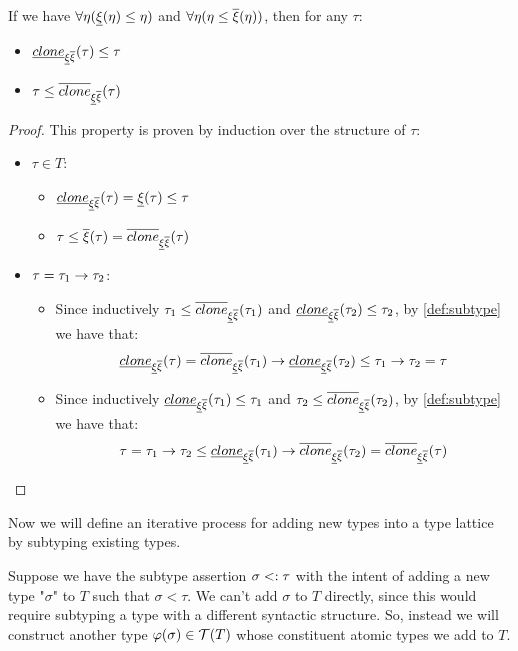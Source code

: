 \documentclass[main.tex]{subfiles}
\begin{document}
\begin{property}
    \label{prop:clone:rel}
    If we have $\forall \eta (\underline{\xi}(\eta) \leq \eta)$ and
    $\forall \eta (\eta \leq \overline{\xi}(\eta))$, then for
    any $\tau$:
    \begin{itemize}
        \item $\underline{clone}_{\underline{\xi} \overline{\xi}}(\tau) \leq \tau$
        \item $\tau \leq \overline{clone}_{\underline{\xi} \overline{\xi}}(\tau)$
    \end{itemize}
\end{property}
\begin{proof}
    This property is proven by induction over the structure of $\tau$:

    \begin{itemize}
        \item $\tau \in T$:
            \begin{itemize}
                \item $\underline{clone}_{\underline{\xi} \overline{\xi}}(\tau) = \underline{\xi}(\tau) \leq \tau$
                \item $\tau \leq \overline{\xi}(\tau) = \overline{clone}_{\underline{\xi} \overline{\xi}}(\tau)$
            \end{itemize}
        \item $\tau = \tau_1 \rightarrow \tau_2$:
            \begin{itemize}
                \item Since inductively $\tau_1 \leq \overline{clone}_{\underline{\xi} \overline{\xi}}(\tau_1)$
                    and $\underline{clone}_{\underline{\xi} \overline{\xi}}(\tau_2) \leq \tau_2$, by \cref{def:subtype}
                    we have that:
                    \[ \underline{clone}_{\underline{\xi} \overline{\xi}}(\tau) = \overline{clone}_{\underline{\xi} \overline{\xi}}(\tau_1) \rightarrow \underline{clone}_{\underline{\xi} \overline{\xi}}(\tau_2)
                    \leq \tau_1 \rightarrow \tau_2 = \tau \]
                \item Since inductively $\underline{clone}_{\underline{\xi} \overline{\xi}}(\tau_1) \leq \tau_1$
                    and $\tau_2 \leq \overline{clone}_{\underline{\xi} \overline{\xi}}(\tau_2)$, by \cref{def:subtype}
                    we have that:
                    \[ \tau = \tau_1 \rightarrow \tau_2 \leq
                    \underline{clone}_{\underline{\xi} \overline{\xi}}(\tau_1) \rightarrow \overline{clone}_{\underline{\xi} \overline{\xi}}(\tau_2) = \overline{clone}_{\underline{\xi} \overline{\xi}}(\tau) \]
            \end{itemize}
    \end{itemize}
\end{proof}

Now we will define an iterative process for adding new types into a type lattice
by subtyping existing types.

Suppose we have the subtype assertion $\sigma <: \tau$ with the intent of adding
a new type "$\sigma$" to $T$ such that $\sigma \less \tau$. We can't add $\sigma$
to $T$ directly, since this would require subtyping a type with a different syntactic
structure. So, instead we will construct another type $\varphi(\sigma) \in \mathcal{T}( T )$
whose constituent atomic types we add to $T$.
\end{document}
